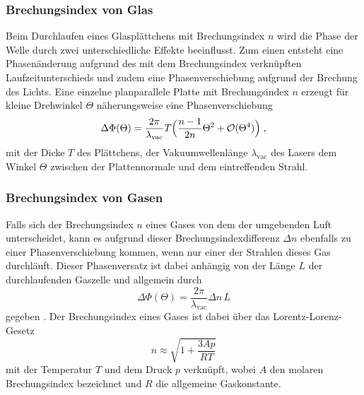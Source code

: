 \subsubsection{Brechungsindex von Glas}
Beim Durchlaufen eines Glasplättchens mit Brechungsindex $n$ wird die Phase der Welle durch zwei
unterschiedliche Effekte beeinflusst. Zum einen entsteht eine Phasenänderung aufgrund
des mit dem Brechungsindex verknüpften Laufzeitunterschieds und zudem eine
Phasenverschiebung aufgrund der Brechung des Lichts. Eine einzelne planparallele Platte
mit Brechungsindex $n$ erzeugt für kleine Drehwinkel $\Theta$  näherungsweise eine Phasenverschiebung \cite{skript}
\begin{equation}
\Delta \Phi(\Theta)=\frac{2\pi}{\lambda_{\text{vac}}}T\Bigl(\frac{n-1}{2n}\Theta^2+\mathcal{O}(\Theta^4)   \Bigr) \; ,
\label{eq:pM}
\end{equation}
mit der Dicke $T$ des Plättchens, der Vakuumwellenlänge $\lambda_{\text{vac}}$ des Lasers dem Winkel $\Theta$
zwischen der Plattennormale und dem eintreffenden Strahl.

\subsubsection{Brechungsindex von Gasen}
Falls sich der Brechungsindex $n$ eines Gases von dem der umgebenden Luft unterscheidet, kann es
aufgrund dieser Brechungsindexdifferenz $\Delta n$ ebenfalls zu einer Phasenverschiebung
kommen, wenn nur einer der Strahlen dieses Gas durchläuft.
Dieser Phasenversatz ist dabei anhängig von der Länge $L$
der durchlaufenden Gaszelle und allgemein durch
\begin{equation}
\Delta \Phi(\Theta)=\frac{2\pi}{\lambda_{\text{vac}}} \Delta n\,L
\label{eq:pM}
\end{equation}
gegeben \cite{skript}. Der Brechungsindex eines Gases ist dabei über das Lorentz-Lorenz-Gesetz
\begin{equation}
  n \approx \sqrt{1+ \frac{3Ap}{RT}}
\end{equation}
mit der Temperatur $T$ und dem Druck $p$ verknüpft, wobei $A$ den molaren Brechungsindex
bezeichnet und $R$ die allgemeine Gaskonstante.
